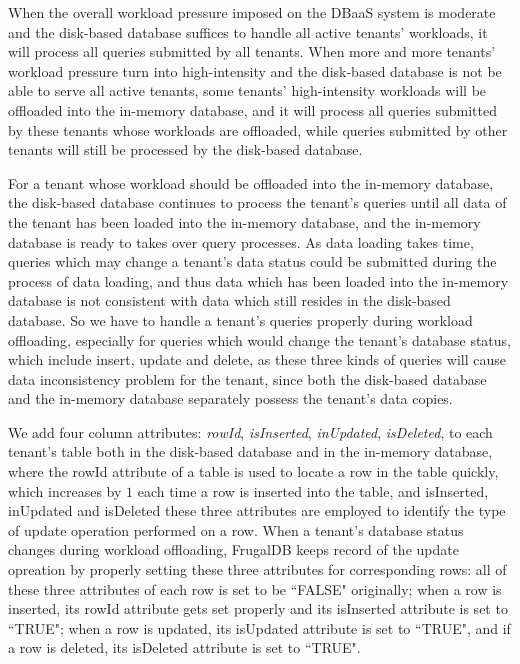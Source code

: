 When the overall workload pressure imposed on the DBaaS system is moderate and the disk-based database suffices to handle all active tenants' workloads, it will process all queries submitted by all tenants. When more and more tenants' workload pressure turn into high-intensity and the disk-based database is not be able to serve all active tenants, some tenants' high-intensity workloads will be offloaded into the in-memory database, and it will process all queries submitted by these tenants whose workloads are offloaded, while queries submitted by other tenants will still be processed by the disk-based database.

For a tenant whose workload should be offloaded into the in-memory database, the disk-based database continues to process the tenant's queries until all data of the tenant has been loaded into the in-memory database, and the in-memory database is ready to takes over query processes. As data loading takes time, queries which may change a tenant's data status could be submitted during the process of data loading, and thus data which has been loaded into the in-memory database is not consistent with data which still resides in the disk-based database. So we have to handle a tenant's queries properly during workload offloading, especially for queries which would change the tenant's database status, which include insert, update and delete, as these three kinds of queries will cause data inconsistency problem for the tenant, since both the disk-based database and the in-memory database separately possess the tenant's data copies.

We add  four column attributes: \emph{rowId}, \emph{isInserted}, \emph{inUpdated}, \emph{isDeleted}, to each tenant's table both in the disk-based database and in the in-memory database, where the rowId attribute of a table is used to locate a row in the table quickly, which increases by $1$ each time a row is inserted into the table, and isInserted, inUpdated and isDeleted these three attributes are employed to identify the type of update operation performed on a row. When a tenant's database status changes during workload offloading, FrugalDB keeps record of the update opreation by properly setting these three attributes for corresponding rows: all of these three attributes of each row is set to be ``FALSE" originally; when a row is inserted, its rowId attribute gets set properly and its isInserted attribute is set to ``TRUE"; when a row is updated, its isUpdated attribute is set to ``TRUE", and if a row is deleted, its isDeleted attribute is set to ``TRUE".

